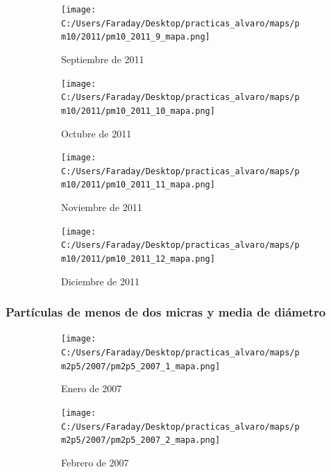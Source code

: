 \documentclass[12pt]{article}
\begin{document}
\begin{figure}[H]
\centering
\begin{subfigure}[h]{0.45\textwidth}
\texttt{[image: C:/Users/Faraday/Desktop/practicas\_alvaro/maps/pm10/2011/pm10\_2011\_9\_mapa.png]}
\caption{Septiembre de 2011}
\label{fig:map-mon-3-9-2011}
\end{subfigure}
%
\begin{subfigure}[H]{0.45\textwidth}
\texttt{[image: C:/Users/Faraday/Desktop/practicas\_alvaro/maps/pm10/2011/pm10\_2011\_10\_mapa.png]}
\caption{Octubre de 2011}
\label{fig:map-mon-3-10-2011}
\end{subfigure}
\caption{}
\end{figure}

\begin{figure}[H]
\centering
\begin{subfigure}[h]{0.45\textwidth}
\texttt{[image: C:/Users/Faraday/Desktop/practicas\_alvaro/maps/pm10/2011/pm10\_2011\_11\_mapa.png]}
\caption{Noviembre de 2011}
\label{fig:map-mon-3-11-2011}
\end{subfigure}
%
\begin{subfigure}[H]{0.45\textwidth}
\texttt{[image: C:/Users/Faraday/Desktop/practicas\_alvaro/maps/pm10/2011/pm10\_2011\_12\_mapa.png]}
\caption{Diciembre de 2011}
\label{fig:map-mon-3-12-2011}
\end{subfigure}
\caption{}
\end{figure}

\newpage

\subsubsection*{Partículas de menos de dos micras y media de diámetro}
%

\begin{figure}[H]
\centering
\begin{subfigure}[h]{0.45\textwidth}
\texttt{[image: C:/Users/Faraday/Desktop/practicas\_alvaro/maps/pm2p5/2007/pm2p5\_2007\_1\_mapa.png]}
\caption{Enero de 2007}
\label{fig:map-mon-4-1-2007}
\end{subfigure}
%
\begin{subfigure}[H]{0.45\textwidth}
\texttt{[image: C:/Users/Faraday/Desktop/practicas\_alvaro/maps/pm2p5/2007/pm2p5\_2007\_2\_mapa.png]}
\caption{Febrero de 2007}
\label{fig:map-mon-4-2-2007}
\end{subfigure}
\caption{}
\end{figure}
\end{document}

